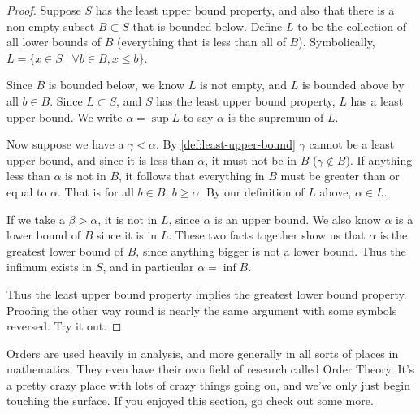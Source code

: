\documentclass[../../templates/section]{subfiles}
\begin{document}
\begin{proof}
    Suppose $S$ has the least upper bound property, and also that there is a
    non-empty subset $B\subset S$ that is bounded below. Define $L$ to be the
    collection of all lower bounds of $B$ (everything that is less than all of
    $B$). Symbolically, $L = \{x\in S \mid \forall b\in B, x\leq b\}$.
    
    Since $B$ is bounded below, we know $L$ is not empty, and $L$ is bounded
    above by all $b\in B$. Since $L\subset S$, and $S$ has the least upper bound
    property, $L$ has a least upper bound. We write $\alpha = \sup{L}$ to say
    $\alpha$ is the supremum of $L$.

    Now suppose we have a $\gamma < \alpha$. By \cref{def:least-upper-bound}
    $\gamma$ cannot be a least upper bound, and since it is less than $\alpha$,
    it must not be in $B$ ($\gamma\notin B$). If anything less than $\alpha$ is
    not in $B$, it follows that everything in $B$ must be greater than or equal
    to $\alpha$. That is for all $b\in B$, $b \geq \alpha$. By our definition of
    $L$ above, $\alpha\in L$.

    If we take a $\beta > \alpha$, it is not in $L$, since $\alpha$ is an upper
    bound. We also know $\alpha$ is a lower bound of $B$ since it is in $L$.
    These two facts together show us that $\alpha$ is the greatest lower bound
    of $B$, since anything bigger is not a lower bound. Thus the infimum exists
    in $S$, and in particular $\alpha = \inf{B}$.

    Thus the least upper bound property implies the greatest lower bound
    property. Proofing the other way round is nearly the same argument with some
    symbols reversed. Try it out.
\end{proof}

Orders are used heavily in analysis, and more generally in all sorts of places
in mathematics. They even have their own field of research called Order Theory.
It's a pretty crazy place with lots of crazy things going on, and we've only
just begin touching the surface. If you enjoyed this section, go check out some
more.
\end{document}
